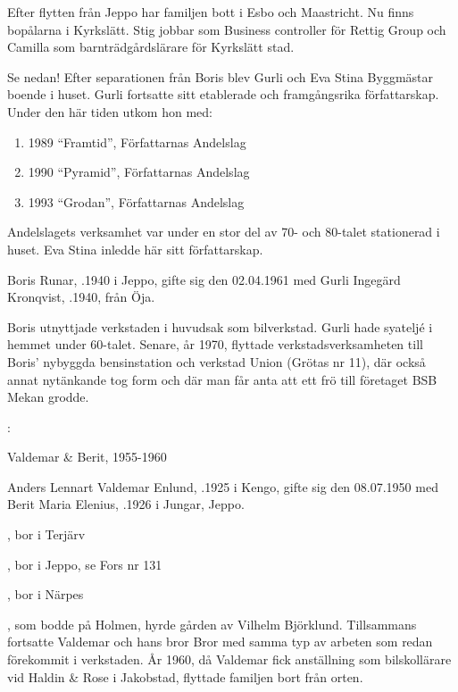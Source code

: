 Efter flytten från Jeppo har familjen bott i Esbo och Maastricht. Nu finns bopålarna i Kyrkslätt. Stig jobbar som Business controller för Rettig Group och Camilla som barnträdgårdslärare för Kyrkslätt stad.


%
Se nedan! Efter separationen från Boris blev Gurli och Eva Stina Byggmästar	boende i huset. Gurli fortsatte sitt etablerade och framgångsrika författarskap. Under den här tiden utkom hon med:
\begin{enumerate}
  \item 1989	``Framtid'', Författarnas Andelslag
  \item 1990	``Pyramid'', Författarnas Andelslag
  \item 1993	``Grodan'', Författarnas Andelslag
\end{enumerate}


Andelslagets verksamhet var under en stor del av 70- och 80-talet stationerad i huset. Eva Stina inledde här sitt författarskap.


%
Boris Runar, .1940 i Jeppo, gifte sig den 02.04.1961 med Gurli Ingegärd Kronqvist, .1940, från Öja.
\begin{jhchildren}
  \item {}
  \item {}
  \item {}
\end{jhchildren}

Boris utnyttjade verkstaden i huvudsak som bilverkstad. Gurli hade syateljé i hemmet under 60-talet. Senare, år 1970, flyttade verkstadsverksamheten till Boris' nybyggda bensinstation och verkstad Union (Grötas nr 11), där också annat nytänkande tog form och där man får anta att ett frö till företaget BSB Mekan grodde.


:

 Valdemar \& Berit, 1955-1960

Anders Lennart Valdemar Enlund, .1925 i Kengo, gifte sig den 08.07.1950 med Berit Maria Elenius, .1926 i Jungar, Jeppo.
\begin{jhchildren}
  \item {}, bor i Terjärv
  \item {}, bor i Jeppo, se Fors nr 131
  \item {}, bor i Närpes
\end{jhchildren}
, som bodde på Holmen, hyrde gården av Vilhelm Björklund. Tillsammans fortsatte Valdemar och hans bror Bror med samma typ av arbeten som redan förekommit i verkstaden. År 1960, då Valdemar fick anställning som bilskollärare vid Haldin \& Rose i Jakobstad, flyttade familjen bort från orten.


